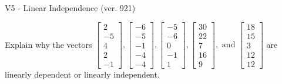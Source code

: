 \begin{exercise}
  \begin{exerciseTitle}V5 - Linear Independence (ver. 921)\end{exerciseTitle}
  \begin{exerciseStatement}
    Explain why the vectors \(\left[\begin{array}{r}
2 \\
-5 \\
4 \\
2 \\
-1
\end{array}\right] , \left[\begin{array}{r}
-6 \\
-5 \\
-1 \\
-4 \\
-4
\end{array}\right] , \left[\begin{array}{r}
-5 \\
-6 \\
0 \\
-1 \\
1
\end{array}\right] , \left[\begin{array}{r}
30 \\
22 \\
7 \\
16 \\
9
\end{array}\right] , \text{ and } \left[\begin{array}{r}
18 \\
15 \\
3 \\
12 \\
12
\end{array}\right]\) are linearly dependent or linearly independent.	



\end{exerciseStatement}
\end{exercise}
